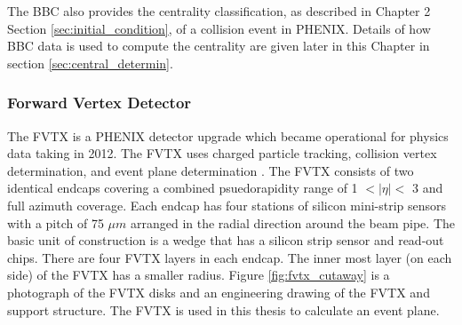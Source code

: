 The BBC also provides the centrality classification, as described in Chapter 2 Section \ref{sec:initial_condition}, of a collision event in PHENIX. Details of how BBC data is used to compute the centrality are given later in this Chapter in section \ref{sec:central_determin}.

\subsubsection{Forward Vertex Detector}
The FVTX is a PHENIX detector upgrade which became operational for physics data taking in 2012. The FVTX uses charged particle tracking, collision vertex determination, and event plane determination \cite{Aidala201444}. The FVTX consists of two identical endcaps covering a combined psuedorapidity range of 1 $<|\eta|<$ 3 and full azimuth coverage. Each endcap has four stations of silicon mini-strip sensors with a pitch of 75 $\mu m$ arranged in the radial direction around the beam pipe. The basic unit of construction is a wedge that has a silicon strip sensor and read-out chips. There are four FVTX layers in each endcap. The inner most layer (on each side) of the FVTX has a smaller radius. Figure \ref{fig:fvtx_cutaway} is a photograph of the FVTX disks and an engineering drawing of the FVTX and support structure. The FVTX is used in this thesis to calculate an event plane.
